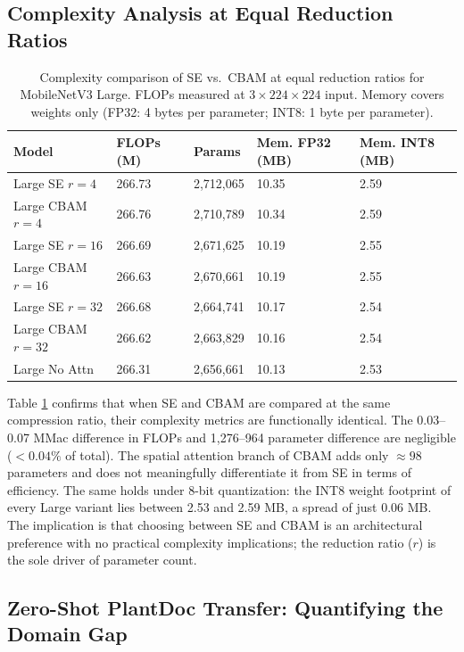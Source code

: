 \documentclass[preprint,12pt]{elsarticle}
\begin{document}
\subsection{Complexity Analysis at Equal Reduction Ratios}

\begin{table}[t]
\centering
\caption{Complexity comparison of SE vs.\ CBAM at equal reduction ratios for MobileNetV3 Large. FLOPs measured at $3\times224\times224$ input. Memory covers weights only (FP32: 4 bytes per parameter; INT8: 1 byte per parameter).}
\label{tab:equal_r}
\begin{tabularx}{0.85\textwidth}{lXXXX}
\toprule
\textbf{Model} & \textbf{FLOPs (M)} & \textbf{Params} & \textbf{Mem. FP32 (MB)} & \textbf{Mem. INT8 (MB)} \\
\midrule
Large SE $r=4$  & 266.73 & 2,712,065 & 10.35 & 2.59 \\
Large CBAM $r=4$ & 266.76 & 2,710,789 & 10.34 & 2.59 \\
Large SE $r=16$  & 266.69 & 2,671,625 & 10.19 & 2.55 \\
Large CBAM $r=16$ & 266.63 & 2,670,661 & 10.19 & 2.55 \\
Large SE $r=32$  & 266.68 & 2,664,741 & 10.17 & 2.54 \\
Large CBAM $r=32$ & 266.62 & 2,663,829 & 10.16 & 2.54 \\
Large No Attn    & 266.31 & 2,656,661 & 10.13 & 2.53 \\
\bottomrule
\end{tabularx}
\end{table}

Table \ref{tab:equal_r} confirms that when SE and CBAM are compared at the same compression ratio, their complexity metrics are functionally identical. The 0.03--0.07 MMac difference in FLOPs and 1,276--964 parameter difference are negligible ($<0.04\%$ of total). The spatial attention branch of CBAM adds only $\approx 98$ parameters and does not meaningfully differentiate it from SE in terms of efficiency. The same holds under 8-bit quantization: the INT8 weight footprint of every Large variant lies between 2.53 and 2.59 MB, a spread of just 0.06 MB. The implication is that choosing between SE and CBAM is an architectural preference with no practical complexity implications; the reduction ratio ($r$) is the sole driver of parameter count.

\subsection{Zero-Shot PlantDoc Transfer: Quantifying the Domain Gap}
\label{sec:plantdoc_zeroshot}
\end{document}
